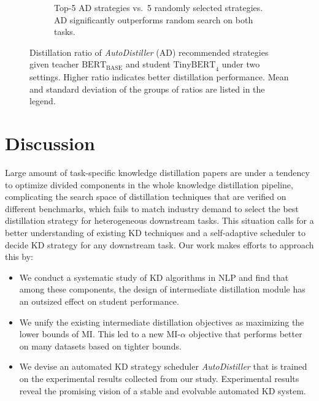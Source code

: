 \documentclass[11pt]{article}
\begin{document}
\begin{figure}[!tb]
\begin{subfigure}[b]{0.35\textwidth}
    \caption{Top-5 AD strategies vs.\ 5 randomly selected strategies. AD significantly outperforms random search on both tasks.}
    \label{fig:AD:compare-random}
    \end{subfigure}
    \caption{Distillation ratio of  \emph{AutoDistiller} (AD) recommended strategies given teacher $\text{BERT}_\text{BASE}$ and student $\text{TinyBERT}_4$ under two settings. Higher ratio indicates better distillation performance. Mean and standard deviation of the groups of ratios are listed in the legend.}
    \label{fig:AD}
    \vspace{-1em}
\end{figure}


\section{Discussion}
\label{discussion}
Large amount of task-specific knowledge distillation papers are under a tendency to optimize divided components in the whole knowledge distillation pipeline, complicating the search space of distillation techniques that are verified on different benchmarks, which fails to match industry demand to select the best distillation strategy for heterogeneous downstream tasks. This situation calls for a better understanding of existing KD techniques and a self-adaptive scheduler to decide KD strategy for any downstream task. Our work makes efforts to approach this by:
\begin{itemize}
    \item We conduct a systematic study of KD algorithms in NLP and find that among these components, the design of intermediate distillation module has an outsized effect on student performance.
    \item We unify the existing intermediate distillation objectives as maximizing the lower bounds of MI. This led to a new MI-$\alpha$ objective that performs better on many datasets based on tighter bounds.
    \item We devise an automated KD strategy scheduler \emph{AutoDistiller} that is trained on the experimental results collected from our study. Experimental results reveal the promising vision of a stable and evolvable automated KD system.
\end{itemize}
\end{document}
